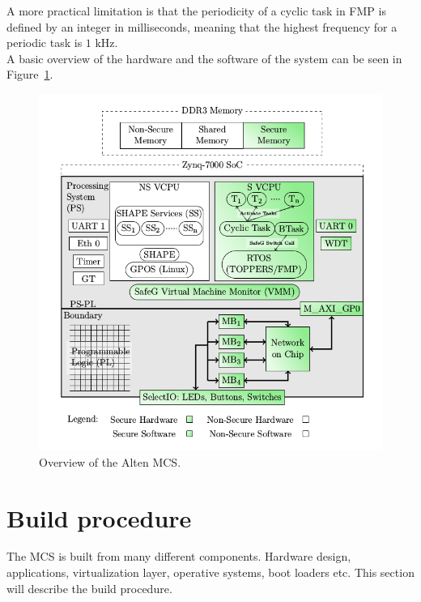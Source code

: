 A more practical limitation is that the periodicity of a cyclic task in FMP is defined by an integer in milliseconds, meaning that the highest frequency for a periodic task is $1\textrm{ kHz}$.\\

A basic overview of the hardware and the software of the system can be seen in Figure~\ref{fig:system_overview}.

\begin{figure}[H]
\centering
\includegraphics[width=\textwidth]{./img/system_overview.png}
\caption{Overview of the Alten MCS.\cite{zaki2016}}\label{fig:system_overview}
\end{figure}

\section{Build procedure}
The MCS is built from many different components. Hardware design, applications, virtualization layer, operative systems, boot loaders etc. This section will describe the build procedure.\\

